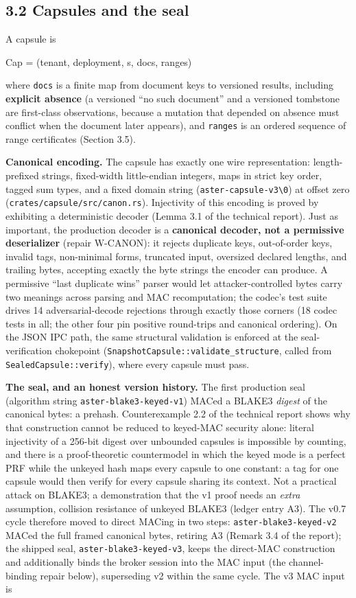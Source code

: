 \documentclass[
  11pt,
]{article}
\begin{document}
\subsection{3.2 Capsules and the seal}\label{capsules-and-the-seal}

A capsule is

Cap = (tenant, deployment, s, docs, ranges)

where \texttt{docs} is a finite map from document keys to versioned results, including \textbf{explicit absence} (a versioned ``no such document'' and a versioned tombstone are first-class observations, because a mutation that depended on absence must conflict when the document later appears), and \texttt{ranges} is an ordered sequence of range certificates (Section 3.5).

\textbf{Canonical encoding.} The capsule has exactly one wire representation: length-prefixed strings, fixed-width little-endian integers, maps in strict key order, tagged sum types, and a fixed domain string (\texttt{aster-capsule-v3\textbackslash{}0}) at offset zero (\texttt{crates/capsule/src/canon.rs}). Injectivity of this encoding is proved by exhibiting a deterministic decoder (Lemma 3.1 of the technical report). Just as important, the production decoder is a \textbf{canonical decoder, not a permissive deserializer} (repair W-CANON): it rejects duplicate keys, out-of-order keys, invalid tags, non-minimal forms, truncated input, oversized declared lengths, and trailing bytes, accepting exactly the byte strings the encoder can produce. A permissive ``last duplicate wins'' parser would let attacker-controlled bytes carry two meanings across parsing and MAC recomputation; the codec's test suite drives 14 adversarial-decode rejections through exactly those corners (18 codec tests in all; the other four pin positive round-trips and canonical ordering). On the JSON IPC path, the same structural validation is enforced at the seal-verification chokepoint (\texttt{SnapshotCapsule::validate\_structure}, called from \texttt{SealedCapsule::verify}), where every capsule must pass.

\textbf{The seal, and an honest version history.} The first production seal (algorithm string \texttt{aster-blake3-keyed-v1}) MACed a BLAKE3 \emph{digest} of the canonical bytes: a prehash. Counterexample 2.2 of the technical report shows why that construction cannot be reduced to keyed-MAC security alone: literal injectivity of a 256-bit digest over unbounded capsules is impossible by counting, and there is a proof-theoretic countermodel in which the keyed mode is a perfect PRF while the unkeyed hash maps every capsule to one constant: a tag for one capsule would then verify for every capsule sharing its context. Not a practical attack on BLAKE3; a demonstration that the v1 proof needs an \emph{extra} assumption, collision resistance of unkeyed BLAKE3 (ledger entry A3). The v0.7 cycle therefore moved to direct MACing in two steps: \texttt{aster-blake3-keyed-v2} MACed the full framed canonical bytes, retiring A3 (Remark 3.4 of the report); the shipped seal, \texttt{aster-blake3-keyed-v3}, keeps the direct-MAC construction and additionally binds the broker session into the MAC input (the channel-binding repair below), superseding v2 within the same cycle. The v3 MAC input is
\end{document}
